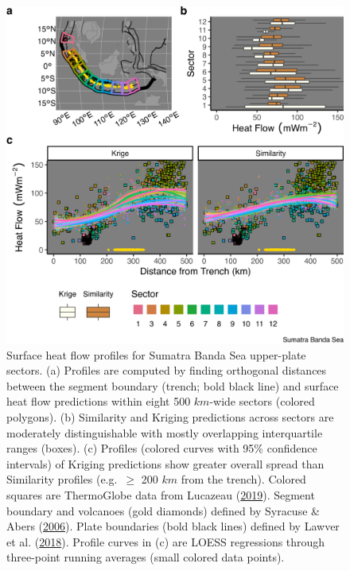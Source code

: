 \begin{figure}[htbp]

{\centering \includegraphics[width=1\linewidth,]{assets/figs/chpt3/SumatraBandaSeaUpperPlate} 

}

\caption[Surface heat flow profiles for Sumatra Banda Sea upper-plate sectors]{Surface heat flow profiles for Sumatra Banda Sea upper-plate sectors. (a) Profiles are computed by finding orthogonal distances between the segment boundary (trench; bold black line) and surface heat flow predictions within eight 500 \(km\)-wide sectors (colored polygons). (b) Similarity and Kriging predictions across sectors are moderately distinguishable with mostly overlapping interquartile ranges (boxes). (c) Profiles (colored curves with 95\% confidence intervals) of Kriging predictions show greater overall spread than Similarity profiles (e.g.~\(\geq\) 200 \(km\) from the trench). Colored squares are ThermoGlobe data from Lucazeau (\protect\hyperlink{ref-lucazeau2019}{2019}). Segment boundary and volcanoes (gold diamonds) defined by Syracuse \& Abers (\protect\hyperlink{ref-syracuse2006}{2006}). Plate boundaries (bold black lines) defined by Lawver et al. (\protect\hyperlink{ref-lawver2018}{2018}). Profile curves in (c) are LOESS regressions through three-point running averages (small colored data points).}\label{fig:sumatraBandaSeaUpper}
\end{figure}

